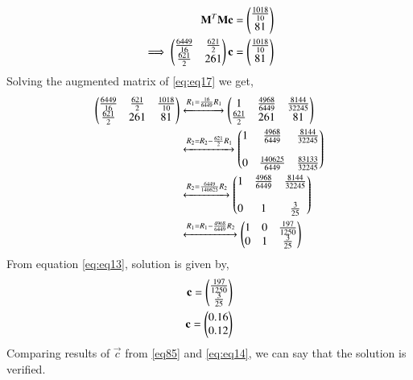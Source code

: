\documentclass[journal,12pt,twocolumn]{IEEEtran}
\begin{document}
\begin{align}
\mathbf{M}^T\mathbf{M}\mathbf{c} &= \begin{pmatrix}\frac{1018}{10}\\81\end{pmatrix}\\
\implies\begin{pmatrix}\frac{6449}{16}&\frac{621}{2}\\\frac{621}{2}&261\end{pmatrix}\mathbf{c} &= \begin{pmatrix}\frac{1018}{10}\\81\end{pmatrix}\label{eq:eq17}
\end{align}
Solving the augmented matrix of \eqref{eq:eq17} we get,
\begin{align}
\begin{pmatrix}\frac{6449}{16}&\frac{621}{2}&\frac{1018}{10}\\\frac{621}{2}&261 & 81\end{pmatrix} &\xleftrightarrow{R_1=\frac{16}{6449}R_1}\begin{pmatrix}1&\frac{4968}{6449}&\frac{8144}{32245}\\\frac{621}{2}&261&81\end{pmatrix}\\
&\xleftrightarrow{R_2=R_2-\frac{621}{2}R_1}\begin{pmatrix}1&\frac{4968}{6449}&\frac{8144}{32245}\\\\0&\frac{140625}{6449}&\frac{83133}{32245}\end{pmatrix}\\
&\xleftrightarrow{R_2=\frac{6449}{140625}R_2}\begin{pmatrix}1&\frac{4968}{6449}&\frac{8144}{32245}\\\\0&1&\frac{3}{25}\end{pmatrix}\\
&\xleftrightarrow{R_1=R_1-\frac{4968}{6449}R_2}\begin{pmatrix}1&0&\frac{197}{1250}\\0&1&\frac{3}{25}\end{pmatrix}\label{eq:eq13}
\end{align}
From equation \eqref{eq:eq13}, solution is given by,
\begin{align}
\mathbf{c}=\begin{pmatrix}\frac{197}{1250}\\\frac{3}{25}\end{pmatrix}\\
\mathbf{c}=\begin{pmatrix}0.16\\0.12\end{pmatrix}\label{eq:eq14}
\end{align}
Comparing results of $\vec{c}$ from \eqref{eq85} and \eqref{eq:eq14}, we can say that the solution is verified.
\end{document}
